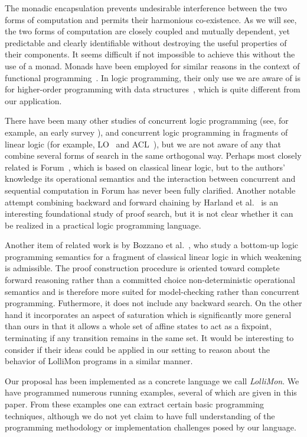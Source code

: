 \documentclass{sig-alt}
\begin{document}
The monadic encapsulation prevents undesirable interference between
the two forms of computation and permits their harmonious
co-existence.  As we will see, the two forms of computation are
closely coupled and mutually dependent, yet predictable and clear\-ly
identifiable without destroying the useful properties of their
components.  It seems difficult if not impossible to achieve this
without the use of a monad.  Monads have been employed for similar
reasons in the context of functional programming~\cite{Wadler92popl}.
In logic programming, their only use we are aware of is for
higher-order programming with data structures~\cite{Bekkers95ilps,McGrail97},
which is quite different from our application.

There have been many other studies of concurrent logic programming (see,
for example, an early survey \cite{Shapiro89}), and concurrent logic
programming in fragments of linear logic (for example, LO~\cite{Andreoli90oopsla} and
ACL~\cite{Kobayashi94tr}), but we are not aware of
any that combine several forms of search in the same orthogonal way.
Perhaps most closely related is Forum~\cite{Miller96tcs}, which is based on
classical linear logic, but to the authors' knowledge its operational
semantics and the interaction between concurrent and sequential
computation in Forum has never been fully clarified.  Another notable
attempt combining backward and forward chaining by Harland et
al.\ \cite{Harland00pstt} is an interesting foundational study of proof
search, but it is not clear whether it can be realized in a practical
logic programming language.

Another item of related work is by Bozzano et al.~\cite{Bozzano04tplp},
who study a bottom-up logic programming semantics for a fragment of
classical linear logic in which weakening is admissible.  The proof
construction procedure is oriented toward complete forward reasoning
rather than a committed choice non-deterministic operational semantics
and is therefore more suited for model-checking rather than concurrent
programming.  Futhermore, it does not include any backward search.  On
the other hand it incorporates an aspect of saturation which is
significantly more general than ours in that it allows a whole set of
affine states to act as a fixpoint, terminating if any transition
remains in the same set.  It would be interesting to consider if their
ideas could be applied in our setting to reason about the behavior of
LolliMon programs in a similar manner.
        
Our proposal has been implemented as a concrete language we call
\emph{LolliMon}.  We have programmed numerous running examples,
several of which are given in this paper.  From these examples one can
extract certain basic programming techniques, although we do not yet
claim to have full understanding of the programming methodology or
implementation challenges posed by our language.
\end{document}
